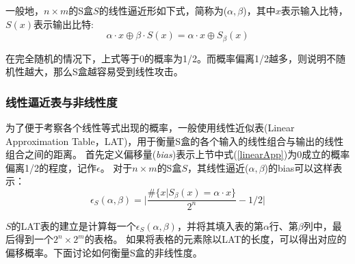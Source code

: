 \documentclass{xduugthesis}
\begin{document}



一般地，$n\times m$的S盒$S$的线性逼近形如下式，简称为($\alpha, \beta$)，其中$x$表示输入比特，$S(x)$表示输出比特:
\begin{equation}\label{linearApp}
    \alpha \cdot x \oplus \beta \cdot S(x) = \alpha \cdot x \oplus S_{\beta}(x)
\end{equation}\par

在完全随机的情况下，上式等于0的概率为1/2。而概率偏离1/2越多，则说明不随机性越大，那么S盒越容易受到线性攻击。

\subsubsection{线性逼近表与非线性度}
为了便于考察各个线性等式出现的概率，一般使用线性近似表(Linear Approximation Table，LAT)，用于衡量S盒的各个输入的线性组合与输出的线性组合之间的距离。
首先定义偏移量(\emph{bias})表示上节中式(\ref{linearApp})为0成立的概率偏离1/2的程度，记作$\epsilon$。 对于$n\times m$的S盒$S$，其线性逼近($\alpha, \beta$)的bias可以这样表示：
$$
\epsilon_S(\alpha,\beta) = \lvert \frac{\#\{x|S_{\beta}(x)=\alpha\cdot x \}}{2^n} -1/2 \rvert
$$\par

$S$的LAT表的建立是计算每一个$\epsilon_S(\alpha,\beta)$，并将其填入表的第$\alpha$行、第$\beta$列中，最后得到一个$2^n \times 2^m$的表格。
如果将表格的元素除以LAT的长度，可以得出对应的偏移概率。下面讨论如何衡量S盒的非线性度。\par
\end{document}
